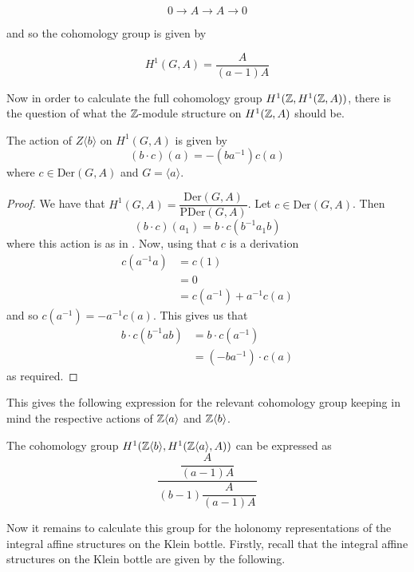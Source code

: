 $$
    0 \to A \to A \to 0
$$

and so the cohomology group is given by

$$
    H^1(G, A) = \dfrac{A}{(a-1)A}
$$

Now in order to calculate the full cohomology group $H^1(\mathbb{Z}, H^1(\mathbb{Z}, A))$,
there is the question of what the $\mathbb{Z}$-module structure on $H^1(\mathbb{Z}, A)$ should
be.

\begin{lemma}
    The action of $Z\langle b \rangle$ on $H^1(G, A)$ is given by
    $$
        ( b \cdot c)(a) = -(ba^{-1})c(a)
    $$
    where $c \in \text{Der}(G, A)$ and $G = \langle a \rangle$.
\end{lemma}
\begin{proof}
    We have that $H^1(G, A) = \dfrac{\text{Der}(G, A)}{\text{PDer}(G, A)}$. Let $c \in \text{Der}(G, A)$. Then
    $$
        (b\cdot c)(a_1) = b\cdot c(b^{-1}a_1 b)
    $$
    where this action is as in \cite{Hochschild1953CohomologyOG}. Now, using that $c$ is a derivation
    \begin{align*}
        c(a^{-1}a) & = c(1)                   \\
                   & = 0                      \\
                   & = c(a^{-1}) + a^{-1}c(a)
    \end{align*}
    and so  $c(a^{-1}) = -a^{-1}c(a)$. This gives us that
    \begin{align*}
        b\cdot c(b^{-1}a b) & = b \cdot c(a^{-1})    \\
                            & = (-ba^{-1})\cdot c(a)
    \end{align*}
    as required.
\end{proof}

This gives the following expression for the relevant cohomology group keeping
in mind the respective actions of $\mathbb{Z}\langle a \rangle$ and $\mathbb{Z}\langle b
    \rangle$.
\begin{corollary}
    The cohomology group $H^1(\mathbb{Z}\langle b \rangle, H^1(\mathbb{Z}\langle a \rangle, A))$ can be expressed as
    $$
        \dfrac{\dfrac{A}{(a-1)A}}{(b-1) \dfrac{A}{(a-1)A}}
    $$
\end{corollary}

Now it remains to calculate this group for the holonomy representations of the
integral affine structures on the Klein bottle. Firstly, recall that the
integral affine structures on the Klein bottle are given by the following.

